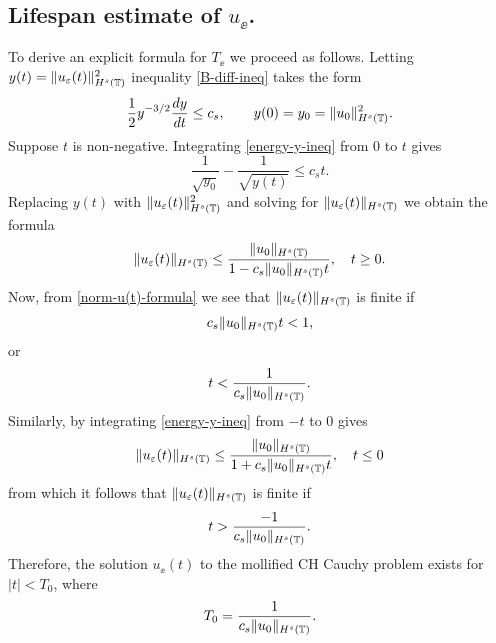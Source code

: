 \subsection{Lifespan estimate of $u_\ee$.} To derive an explicit formula for
$T_\ee$ we proceed as follows.  Letting  $y(t)=
\|u_\varepsilon(t)\|_{H^s(\mathbb{T})}^2$ inequality  \eqref{B-diff-ineq} takes the
form
%
\begin{equation} 
\label{energy-y-ineq}
\frac 12
y^{-3/2}\frac{dy}{dt}
\le
c_s,
\qquad
y(0)=y_0=  \|u_0\|_{H^s(\mathbb{T})}^2.
\end{equation}
%
Suppose $t$ is non-negative. Integrating  \eqref{energy-y-ineq} from  0  to $t$ gives
%
\begin{equation} 
\label{energy-y-ineq-calc1}
\frac{1}{\sqrt{y_0}}  - \frac{1}{\sqrt{y(t)}} 
\le
c_s t.
\end{equation}
%
%
Replacing $y(t)$ with   $\|u_\varepsilon(t)\|_{H^s(\mathbb{T})}^2$  and solving for  $\|u_\varepsilon(t)\|_{H^s(\mathbb{T})}$
we obtain the formula
%
\begin{equation} 
\label{norm-u(t)-formula}
\|u_\varepsilon(t)\|_{H^s(\mathbb{T})}
\le
\frac{\|u_0\|_{H^s(\mathbb{T})}}{1-c_s\|u_0\|_{H^s(\mathbb{T})} t}, \quad t\ge
0.
\end{equation}
%
Now, from \eqref{norm-u(t)-formula} we see that  $\|u_\varepsilon(t)\|_{H^s(\mathbb{T})}$ is finite  if 
%
\begin{equation*} 
\label{Lifespan-calc1}
c_s    \|u_0\|_{H^s(\mathbb{T})} t<1,
\end{equation*}
%
or
%
\begin{equation} 
t
<
\frac{1}{c_s \|u_0\|_{H^s(\mathbb{T})}}.
\end{equation}
%
Similarly, 
by integrating  \eqref{energy-y-ineq} from  $-t$ to $0$ gives
\begin{equation} 
\label{norm-u(t)-formula-prime}
\|u_\varepsilon(t)\|_{H^s(\mathbb{T})}
\le
\frac{\|u_0\|_{H^s(\mathbb{T})}}{1+c_s\|u_0\|_{H^s(\mathbb{T})} t}, \quad t \le 0
\end{equation}
from which it follows that $\|u_\varepsilon(t)\|_{H^s(\mathbb{T})}$ is finite  if 
%
\begin{equation} 
t
>
\frac{-1}{c_s \|u_0\|_{H^s(\mathbb{T})}}.
\end{equation}
Therefore, the  solution  $u_\ee(t)$ to the mollified CH Cauchy
problem exists for $|t| <T_0$, where
%
\begin{equation} 
\label{CH-Lifespan}
T_0
=
\frac{1}{c_s \|u_0\|_{H^s(\mathbb{T})}}.
\end{equation}
%
%  
% 
%
%
%   
%
\noindent
